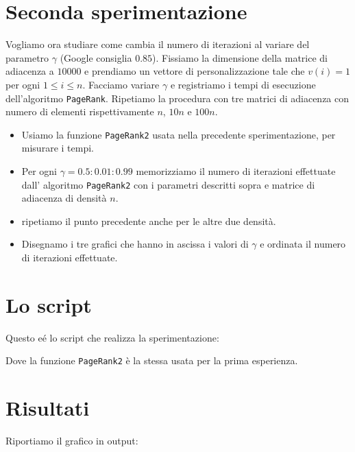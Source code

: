 \documentclass{article}
\begin{document}
	\section{Seconda sperimentazione}
	Vogliamo ora studiare come cambia il numero di iterazioni al variare del parametro $\gamma$ (Google consiglia $0.85$).
	Fissiamo la dimensione della matrice di adiacenza a $10000$ e prendiamo un vettore di personalizzazione tale che $v(i)=1$ per ogni $1 \leq i\leq n$. Facciamo variare $\gamma$ e registriamo i tempi di esecuzione dell'algoritmo {\tt PageRank}. Ripetiamo la procedura con tre matrici di adiacenza con numero di elementi rispettivamente $n$, $10n$ e $100n$.\\
	\begin{itemize}
		\item Usiamo la funzione {\tt PageRank2} usata nella precedente sperimentazione, per misurare i tempi.
		\item Per ogni $\gamma=0.5:0.01:0.99$ memorizziamo il numero di iterazioni effettuate dall' algoritmo {\tt PageRank2} con i parametri descritti sopra e matrice di adiacenza di densità $n$.
		\item ripetiamo il punto precedente anche per le altre due densità.
		\item Disegnamo i tre grafici che hanno in ascissa i valori di $\gamma$ e ordinata il numero di iterazioni effettuate.
	\end{itemize}
	
	\section{Lo script}
	
	Questo e\'e lo script che realizza la sperimentazione:
	
	
	
	Dove la funzione {\tt PageRank2} è la stessa usata per la prima esperienza.
	
	\section{Risultati}
	
	Riportiamo il grafico in output:
	
\end{document}
